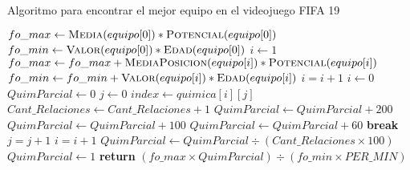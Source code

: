\documentclass{article}
\begin{document}
\renewcommand{\thealgorithm}{}
\begin{algorithm}
    \caption{Algoritmo para encontrar el mejor equipo en el videojuego FIFA 19} 
    \begin{algorithmic}[1]
         
            \State $fo\_max \gets \Call{Media}{equipo[0]} * \Call{Potencial}{equipo[0]}$
            \State $fo\_min \gets \Call{Valor}{equipo[0]} * \Call{Edad}{equipo[0]}$
            \State $i \gets 1$
                \State $fo\_max \gets fo\_max + \Call{MediaPosicion}{equipo[i]} * \Call{Potencial}{equipo[i]}$
                \State $fo\_min \gets fo\_min + \Call{Valor}{equipo[i]} * \Call{Edad}{equipo[i]}$
                \State $i = i+1$
            \EndWhile
            \State $i \gets 0$
            \State $QuimParcial \gets 0$
                \State $j \gets 0$
                        \State $index \gets quimica[i][j]$
                        \State $Cant\_Relaciones \gets Cant\_Relaciones + 1$
                                \State $QuimParcial \gets QuimParcial + 200$
                            \Else 
                                    \State $QuimParcial \gets QuimParcial + 100$
                                \Else
                                    \State $QuimParcial \gets QuimParcial + 60$
                            \EndIf
                        \EndIf
                    \Else
                    \State \textbf{break }
                    \EndIf
                    \State $j = j+1$
                \EndWhile
                \State $i = i+1$
            \EndWhile
            \State $QuimParcial \gets QuimParcial \div (Cant\_Relaciones \times 100)$
            \State $QuimParcial \gets 1$
            \EndIf
            \State \textbf{return }{$(fo\_max \times QuimParcial) \div (fo\_min \times PER\_MIN)$}
        \EndProcedure
    \end{algorithmic}
\end{algorithm}
\end{document}
